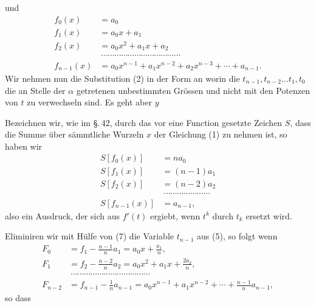 und
\begin{align*}
f_0(x) &= a_0\\
f_1(x) &= a_0 x + a_1\\
f_2(x) &= a_0 x^2 + a_1 x + a_2 \tag{4}\\
&\ \cdots\cdots\cdots\cdots\cdots\cdots\cdots\cdots\cdots\cdots\cdots\cdots\\
f_{n-1}(x) &= a_0 x^{n-1} + a_1 x^{n-2} + a_2 x^{n-3} + \cdots + a_{n-1}.
\end{align*}
Wir nehmen nun die Substitution (2) in der Form an
worin die $t_{n-1}, t_{n-2} \ldots t_1, t_0$ die an Stelle der $\alpha$ getretenen
unbestimmten Gr\"ossen und nicht mit den Potenzen von $t$ zu
verwechseln sind. Es geht aber $y$ 

Bezeichnen wir, wie im \S.\,42, durch das vor eine Function
gesetzte Zeichen $S$, dass die Summe \"uber s\"ammtliche Wurzeln
$x$ der Gleichung (1) zu nehmen ist, so haben wir
\begin{align*}
S[f_0(x)] &= n a_0\\
S[f_1(x)] &= (n-1) a_1\\
S[f_2(x)] &= (n-2) a_2 \tag{6}\\
&\ \cdots\cdots\cdots\cdots\cdots\cdots\cdots\\
S[f_{n-1}(x)] &= a_{n-1},
\end{align*}
also
ein Ausdruck, der sich aus $f'(t)$ ergiebt, wenn $t^k$ durch $t_k$ ersetzt
wird.

Eliminiren wir mit H\"ulfe von (7) die Variable $t_{n-1}$ aus (5),
so folgt
wenn
\begin{align*}
F_0 &= f_1 - \frac{n-1}{n} a_1 = a_0 x + \frac{a_1}{n},\\
F_1 &= f_2 - \frac{n-2}{n} a_2 = a_0 x^2 + a_1 x + \frac{2 a_2}{n}, \tag{9}\\
&\ \cdots\cdots\cdots\cdots\cdots\cdots\cdots\cdots\cdots\cdots\cdots\cdots\\
F_{n-2} &= f_{n-1} - \frac{1}{n} a_{n-1} = a_0 x^{n-1} + a_1 x^{n-2} + \cdots + \frac{n-1}{n} a_{n-1},
\end{align*}
so dass
